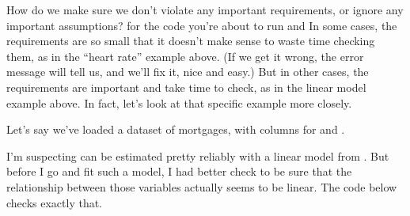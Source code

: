 \documentclass[letterpaper,10pt,english]{jupyterBook}
\begin{document}
\sphinxAtStartPar
How do we make sure we don’t violate any important requirements, or ignore any important assumptions?   for the code you’re about to run and   In some cases, the requirements are so small that it doesn’t make sense to waste time checking them, as in the “heart rate” example above.  (If we get it wrong, the error message will tell us, and we’ll fix it, nice and easy.)  But in other cases, the requirements are important and take time to check, as in the linear model example above.  In fact, let’s look at that specific example more closely.

\sphinxAtStartPar
Let’s say we’ve loaded a dataset of mortgages, with columns for  and .

\begin{sphinxVerbatim}[commandchars=\\\{\}]
   
    
\end{sphinxVerbatim}

\sphinxAtStartPar
I’m suspecting  can be estimated pretty reliably with a linear model from .  But before I go and fit such a model, I had better check to be sure that the relationship between those variables actually seems to be linear.  The code below checks exactly that.
\end{document}
